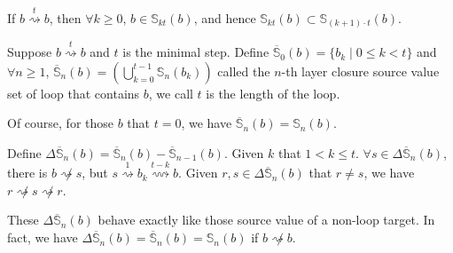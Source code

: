 \begin{proposition}\label{prop:cycle-layer-included}
If $b\overset{t}{\rightsquigarrow} b$, then $\forall k\ge 0$, $b \in \mathbb{S}_{kt}(b)$, and hence $\mathbb{S}_{kt}(b)\subset \mathbb{S}_{(k+1)\cdot t}(b)$.
\end{proposition}
\begin{definition}
    Suppose $b\overset{t}{\rightsquigarrow} b$ and $t$ is the minimal step. Define $\overline{\mathbb{S}}_{0}(b) = \{ b_{k} \mid 0 \le k < t \}$ and $\forall n\ge 1$, $\overline{\mathbb{S}}_{n}(b) = \left(\bigcup_{k=0}^{t-1}\mathbb{S}_n(b_k)\right)$ called the $n$-th layer closure source value set of loop that contains $b$, we call $t$ is the length of the loop.
\end{definition}
Of course, for those $b$ that $t = 0$, we have $\overline{\mathbb{S}}_{n}(b) = \mathbb{S}_{n}(b)$.
\begin{proposition}
    Define $\Delta\overline{\mathbb{S}}_{n}(b) = \overline{\mathbb{S}}_{n}(b) - \overline{\mathbb{S}}_{n-1}(b)$. Given $k$ that $1 < k \le t$. $\forall s \in \Delta\overline{\mathbb{S}}_{n}(b)$, there is $b \not\rightsquigarrow s$, but $s \overset{1}{\rightsquigarrow} b_k \overset{t-k}{\rightsquigarrow} b$. Given $r, s\in \Delta\overline{\mathbb{S}}_{n}(b)$ that $r \ne s$, we have $r \not\rightsquigarrow s \not\rightsquigarrow r$. 
\end{proposition}
These $\Delta\overline{\mathbb{S}}_{n}(b)$ behave exactly like those source value of a non-loop target. In fact, we have $\Delta\overline{\mathbb{S}}_{n}(b) = \overline{\mathbb{S}}_{n}(b) = \mathbb{S}_{n}(b)$ if $b\not\rightsquigarrow b$.

